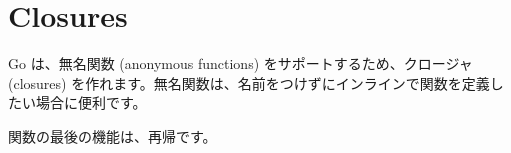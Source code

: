 \section{Closures}

Go は、無名関数 (anonymous functions) をサポートするため、クロージャ (closures) を作れます。無名関数は、名前をつけずにインラインで関数を定義したい場合に便利です。




関数の最後の機能は、再帰です。